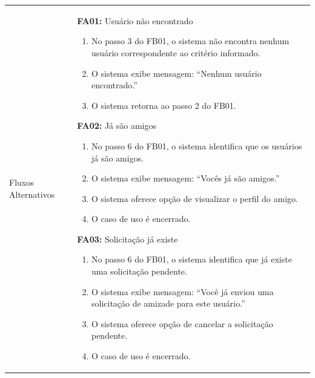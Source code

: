 \begin{longtable}{ >{\raggedright}p{2.8cm} | >{\raggedright\arraybackslash}p{10.7cm} }
Fluxos Alternativos & \mbox{}
\textbf{FA01:} Usuário não encontrado
\vspace{2pt}
\begin{enumerate}[nosep,leftmargin=1.2em,topsep=0pt,partopsep=0pt,parsep=0pt,itemsep=0pt,after=\vspace{2pt}]
	\item No passo 3 do FB01, o sistema não encontra nenhum usuário correspondente ao critério informado.
	\item O sistema exibe mensagem: ``Nenhum usuário encontrado.''
	\item O sistema retorna ao passo 2 do FB01.
\end{enumerate}

\textbf{FA02:} Já são amigos
\vspace{2pt}
\begin{enumerate}[nosep,leftmargin=1.2em,topsep=0pt,partopsep=0pt,parsep=0pt,itemsep=0pt,after=\vspace{2pt}]
	\item No passo 6 do FB01, o sistema identifica que os usuários já são amigos.
	\item O sistema exibe mensagem: ``Vocês já são amigos.''
	\item O sistema oferece opção de visualizar o perfil do amigo.
	\item O caso de uso é encerrado.
\end{enumerate}

\textbf{FA03:} Solicitação já existe
\vspace{2pt}
\begin{enumerate}[nosep,leftmargin=1.2em,topsep=0pt,partopsep=0pt,parsep=0pt,itemsep=0pt,after=\vspace{2pt}]
	\item No passo 6 do FB01, o sistema identifica que já existe uma solicitação pendente.
	\item O sistema exibe mensagem: ``Você já enviou uma solicitação de amizade para este usuário.''
	\item O sistema oferece opção de cancelar a solicitação pendente.
	\item O caso de uso é encerrado.
\end{enumerate}


\end{longtable}
